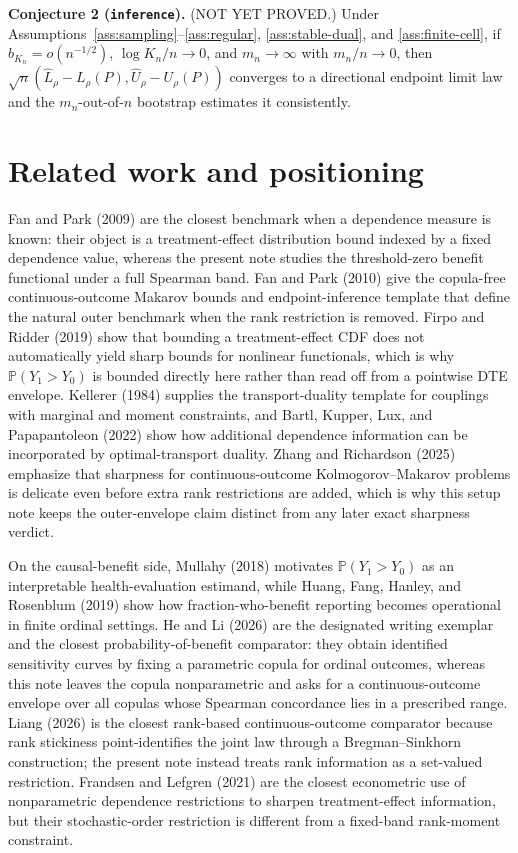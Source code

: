 \documentclass[11pt]{article}
\renewcommand{\Pr}{\mathbb{P}}
\theoremstyle{definition}
\theoremstyle{plain}
\theoremstyle{remark}
\begin{document}
\medskip
\textbf{Conjecture 2 (\texttt{inference}).} (NOT YET PROVED.)  Under Assumptions~\ref{ass:sampling}--\ref{ass:regular}, \ref{ass:stable-dual}, and \ref{ass:finite-cell}, if \(b_{K_n}=o(n^{-1/2})\), \(\log K_n/n\to0\), and \(m_n\to\infty\) with \(m_n/n\to0\), then \(\sqrt n(\widehat L_\rho-L_\rho(P),\widehat U_\rho-U_\rho(P))\) converges to a directional endpoint limit law and the \(m_n\)-out-of-\(n\) bootstrap estimates it consistently.

\section{Related work and positioning}
Fan and Park (2009) are the closest benchmark when a dependence measure is known: their object is a treatment-effect distribution bound indexed by a fixed dependence value, whereas the present note studies the threshold-zero benefit functional under a full Spearman band.  Fan and Park (2010) give the copula-free continuous-outcome Makarov bounds and endpoint-inference template that define the natural outer benchmark when the rank restriction is removed.  Firpo and Ridder (2019) show that bounding a treatment-effect CDF does not automatically yield sharp bounds for nonlinear functionals, which is why \(\Pr(Y_1>Y_0)\) is bounded directly here rather than read off from a pointwise DTE envelope.  Kellerer (1984) supplies the transport-duality template for couplings with marginal and moment constraints, and Bartl, Kupper, Lux, and Papapantoleon (2022) show how additional dependence information can be incorporated by optimal-transport duality.  Zhang and Richardson (2025) emphasize that sharpness for continuous-outcome Kolmogorov--Makarov problems is delicate even before extra rank restrictions are added, which is why this setup note keeps the outer-envelope claim distinct from any later exact sharpness verdict.

On the causal-benefit side, Mullahy (2018) motivates \(\Pr(Y_1>Y_0)\) as an interpretable health-evaluation estimand, while Huang, Fang, Hanley, and Rosenblum (2019) show how fraction-who-benefit reporting becomes operational in finite ordinal settings.  He and Li (2026) are the designated writing exemplar and the closest probability-of-benefit comparator: they obtain identified sensitivity curves by fixing a parametric copula for ordinal outcomes, whereas this note leaves the copula nonparametric and asks for a continuous-outcome envelope over all copulas whose Spearman concordance lies in a prescribed range.  Liang (2026) is the closest rank-based continuous-outcome comparator because rank stickiness point-identifies the joint law through a Bregman--Sinkhorn construction; the present note instead treats rank information as a set-valued restriction.  Frandsen and Lefgren (2021) are the closest econometric use of nonparametric dependence restrictions to sharpen treatment-effect information, but their stochastic-order restriction is different from a fixed-band rank-moment constraint.
\end{document}
